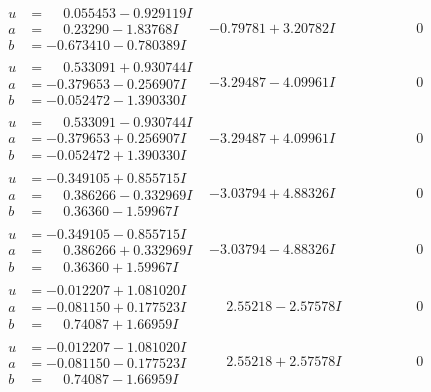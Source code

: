 \documentclass[1p]{elsarticle_modified}
\theoremstyle{definition}
\begin{document}
$$\begin{array}{c|c|c}
\begin{aligned}
u &= \phantom{-}0.055453 - 0.929119 I \\
a &= \phantom{-}0.23290 - 1.83768 I \\
b &= -0.673410 - 0.780389 I\end{aligned}
 & -0.79781 + 3.20782 I & \phantom{-0.000000 } 0 \\ \hline\begin{aligned}
u &= \phantom{-}0.533091 + 0.930744 I \\
a &= -0.379653 - 0.256907 I \\
b &= -0.052472 - 1.390330 I\end{aligned}
 & -3.29487 - 4.09961 I & \phantom{-0.000000 } 0 \\ \hline\begin{aligned}
u &= \phantom{-}0.533091 - 0.930744 I \\
a &= -0.379653 + 0.256907 I \\
b &= -0.052472 + 1.390330 I\end{aligned}
 & -3.29487 + 4.09961 I & \phantom{-0.000000 } 0 \\ \hline\begin{aligned}
u &= -0.349105 + 0.855715 I \\
a &= \phantom{-}0.386266 - 0.332969 I \\
b &= \phantom{-}0.36360 - 1.59967 I\end{aligned}
 & -3.03794 + 4.88326 I & \phantom{-0.000000 } 0 \\ \hline\begin{aligned}
u &= -0.349105 - 0.855715 I \\
a &= \phantom{-}0.386266 + 0.332969 I \\
b &= \phantom{-}0.36360 + 1.59967 I\end{aligned}
 & -3.03794 - 4.88326 I & \phantom{-0.000000 } 0 \\ \hline\begin{aligned}
u &= -0.012207 + 1.081020 I \\
a &= -0.081150 + 0.177523 I \\
b &= \phantom{-}0.74087 + 1.66959 I\end{aligned}
 & \phantom{-}2.55218 - 2.57578 I & \phantom{-0.000000 } 0 \\ \hline\begin{aligned}
u &= -0.012207 - 1.081020 I \\
a &= -0.081150 - 0.177523 I \\
b &= \phantom{-}0.74087 - 1.66959 I\end{aligned}
 & \phantom{-}2.55218 + 2.57578 I & \phantom{-0.000000 } 0 \\ \hline\begin{aligned}

\end{aligned}
\end{array}$$
\end{document}
